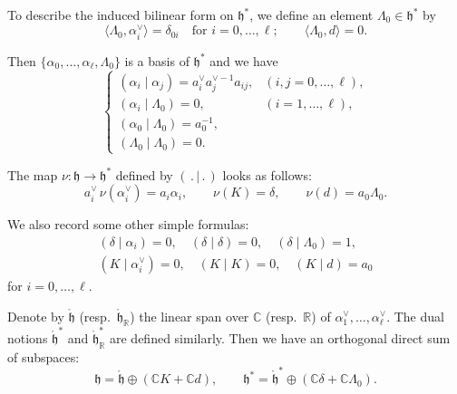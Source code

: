 \documentclass[12pt]{article}
\begin{document}
To describe the induced bilinear form on $\mathfrak{h}^*$, we define an element 
$\Lambda_0 \in \mathfrak{h}^*$ by
\[
    \langle \Lambda_0, \alpha_i^\vee \rangle = \delta_{0i}
    \quad \text{for } i=0,\dots,\ell;
    \qquad
    \langle \Lambda_0, d \rangle = 0.
\]

Then $\{\alpha_0,\dots,\alpha_\ell,\Lambda_0\}$ is a basis of $\mathfrak{h}^*$ and we have
\begin{equation}
\label{eq:6.2.2}
\begin{cases}
(\alpha_i \mid \alpha_j) = a_i^\vee a_j^{\vee -1} a_{ij}, & (i,j=0,\dots,\ell), \\[6pt]
(\alpha_i \mid \Lambda_0) = 0, & (i=1,\dots,\ell), \\[6pt]
(\alpha_0 \mid \Lambda_0) = a_0^{-1}, \\[6pt]
(\Lambda_0 \mid \Lambda_0) = 0.
\end{cases}
\end{equation}

The map $\nu : \mathfrak{h} \to \mathfrak{h}^*$ defined by $(\,.\,|\,.\,)$ looks as follows:
\begin{equation}
\label{eq:6.2.3}
a_i^\vee \, \nu(\alpha_i^\vee) = a_i \alpha_i, 
\qquad 
\nu(K) = \delta,
\qquad 
\nu(d) = a_0 \Lambda_0.
\end{equation}

We also record some other simple formulas:
\begin{align*}
(\delta \mid \alpha_i) = 0, \quad
(\delta \mid \delta) = 0, \quad
(\delta \mid \Lambda_0) = 1, \\
(K \mid \alpha_i^\vee) = 0, \quad
(K \mid K) = 0, \quad 
(K \mid d) = a_0
\end{align*} for $i=0,\dots,\ell$.

Denote by $\mathring{\mathfrak{h}}$ (resp.\ $\mathring{\mathfrak{h}}_{\mathbb{R}}$) the linear span over $\mathbb{C}$ 
(resp.\ $\mathbb{R}$) of $\alpha_1^\vee,\dots,\alpha_\ell^\vee$. 
The dual notions $\mathring{\mathfrak{h}}^{*}$ and $\mathring{\mathfrak{h}}_{\mathbb{R}}^{*}$ are defined similarly. 
Then we have an orthogonal direct sum of subspaces:
\[
\mathfrak{h} = \mathring{\mathfrak{h}} \oplus (\mathbb{C}K + \mathbb{C}d),
\qquad
\mathfrak{h}^* = \mathring{\mathfrak{h}}^* \oplus (\mathbb{C}\delta + \mathbb{C}\Lambda_0).
\]
\end{document}
